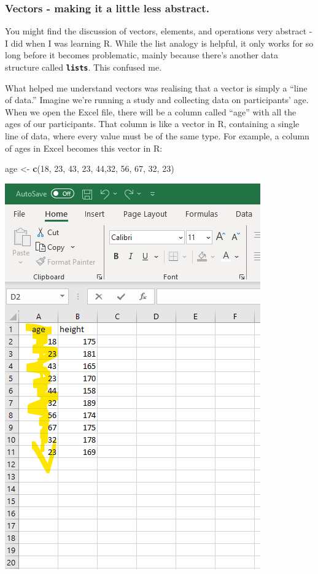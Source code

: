 \documentclass[
]{book}
\newenvironment{Shaded}{\begin{snugshade}}{\end{snugshade}}
\newcommand{\DecValTok}[1]{\textcolor[rgb]{0.00,0.00,0.81}{#1}}
\newcommand{\FunctionTok}[1]{\textcolor[rgb]{0.13,0.29,0.53}{\textbf{#1}}}
\newcommand{\NormalTok}[1]{#1}
\newcommand{\OtherTok}[1]{\textcolor[rgb]{0.56,0.35,0.01}{#1}}
\begin{document}
\subsubsection{Vectors - making it a little less abstract.}\label{vectors---making-it-a-little-less-abstract.}

You might find the discussion of vectors, elements, and operations very abstract - I did when I was learning R. While the list analogy is helpful, it only works for so long before it becomes problematic, mainly because there's another data structure called \textbf{\texttt{lists}}. This confused me.

What helped me understand vectors was realising that a vector is simply a ``line of data.'' Imagine we're running a study and collecting data on participants' age. When we open the Excel file, there will be a column called ``age'' with all the ages of our participants. That column is like a vector in R, containing a single line of data, where every value must be of the same type. For example, a column of ages in Excel becomes this vector in R:

\begin{Shaded}
\begin{Highlighting}[]
\NormalTok{age }\OtherTok{\textless{}{-}} \FunctionTok{c}\NormalTok{(}\DecValTok{18}\NormalTok{, }\DecValTok{23}\NormalTok{, }\DecValTok{43}\NormalTok{, }\DecValTok{23}\NormalTok{, }\DecValTok{44}\NormalTok{,}\DecValTok{32}\NormalTok{, }\DecValTok{56}\NormalTok{, }\DecValTok{67}\NormalTok{, }\DecValTok{32}\NormalTok{, }\DecValTok{23}\NormalTok{)}
\end{Highlighting}
\end{Shaded}

\includegraphics{img/03-column-vector.png}
\end{document}
